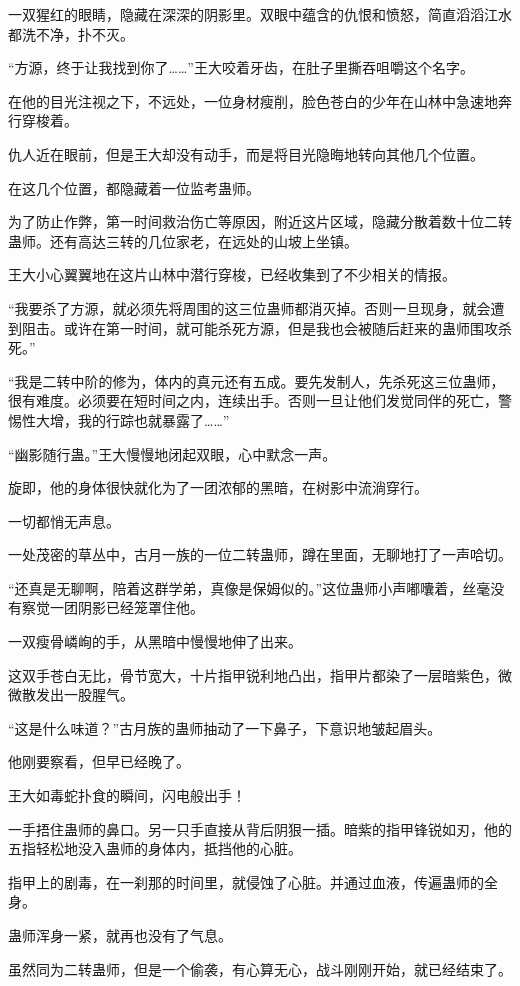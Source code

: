 \begin{this_body}
一双猩红的眼睛，隐藏在深深的阴影里。双眼中蕴含的仇恨和愤怒，简直滔滔江水都洗不净，扑不灭。

“方源，终于让我找到你了……”王大咬着牙齿，在肚子里撕吞咀嚼这个名字。

在他的目光注视之下，不远处，一位身材瘦削，脸色苍白的少年在山林中急速地奔行穿梭着。

仇人近在眼前，但是王大却没有动手，而是将目光隐晦地转向其他几个位置。

在这几个位置，都隐藏着一位监考蛊师。

为了防止作弊，第一时间救治伤亡等原因，附近这片区域，隐藏分散着数十位二转蛊师。还有高达三转的几位家老，在远处的山坡上坐镇。

王大小心翼翼地在这片山林中潜行穿梭，已经收集到了不少相关的情报。

“我要杀了方源，就必须先将周围的这三位蛊师都消灭掉。否则一旦现身，就会遭到阻击。或许在第一时间，就可能杀死方源，但是我也会被随后赶来的蛊师围攻杀死。”

“我是二转中阶的修为，体内的真元还有五成。要先发制人，先杀死这三位蛊师，很有难度。必须要在短时间之内，连续出手。否则一旦让他们发觉同伴的死亡，警惕性大增，我的行踪也就暴露了……”

“幽影随行蛊。”王大慢慢地闭起双眼，心中默念一声。

旋即，他的身体很快就化为了一团浓郁的黑暗，在树影中流淌穿行。

一切都悄无声息。

一处茂密的草丛中，古月一族的一位二转蛊师，蹲在里面，无聊地打了一声哈切。

“还真是无聊啊，陪着这群学弟，真像是保姆似的。”这位蛊师小声嘟囔着，丝毫没有察觉一团阴影已经笼罩住他。

一双瘦骨嶙峋的手，从黑暗中慢慢地伸了出来。

这双手苍白无比，骨节宽大，十片指甲锐利地凸出，指甲片都染了一层暗紫色，微微散发出一股腥气。

“这是什么味道？”古月族的蛊师抽动了一下鼻子，下意识地皱起眉头。

他刚要察看，但早已经晚了。

王大如毒蛇扑食的瞬间，闪电般出手！

一手捂住蛊师的鼻口。另一只手直接从背后阴狠一插。暗紫的指甲锋锐如刃，他的五指轻松地没入蛊师的身体内，抵挡他的心脏。

指甲上的剧毒，在一刹那的时间里，就侵蚀了心脏。并通过血液，传遍蛊师的全身。

蛊师浑身一紧，就再也没有了气息。

虽然同为二转蛊师，但是一个偷袭，有心算无心，战斗刚刚开始，就已经结束了。


\end{this_body}
